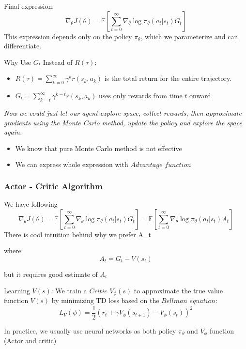 \documentclass[10pt]{beamer}
\begin{document}
\begin{frame}
    Final expression:
    \[
    \nabla_{\theta} J(\theta) = \mathbb{E} \left[ \sum_{t=0}^{\infty} \nabla_{\theta} \log \pi_{\theta}(a_t | s_t) G_t \right]
    \]
    This expression depends only on the policy \( \pi_{\theta} \), which we parameterize and can differentiate.

    \bigskip
    
    Why Use \( G_t \) Instead of \( R(\tau) \):
    \begin{itemize}
        \item \( R(\tau) = \sum_{k=0}^{\infty} \gamma^{k} r(s_k, a_k) \) is the total return for the entire trajectory.
        \item \( G_t = \sum_{k=t}^{\infty} \gamma^{k-t} r(s_k, a_k) \) uses only rewards from time \( t \) onward.
    \end{itemize}
    
    \bigskip

    \textit{Now we could just let our agent explore space, collect rewards, then approximate gradients using the Monte Carlo method, update the policy and explore the space again.}
\end{frame}
\begin{frame}
    \begin{itemize}
        \item We know that pure Monte Carlo method is not effective
        \pause
        \item We can express whole expression with $Advantage$ $function$
    \end{itemize}
\end{frame}

\begin{frame}
    \frametitle{Actor - Critic Algorithm}

    We have following 
    \[
    \nabla_{\theta} J(\theta) = \mathbb{E} \left[ \sum_{t=0}^{\infty} \nabla_{\theta} \log \pi_{\theta}(a_t | s_t) G_t \right] = \mathbb{E} \left[ \sum_{t=0}^{\infty} \nabla_{\theta} \log \pi_{\theta}(a_t | s_t) A_t \right]
    \]
    There is cool intuition behind why we prefer A_t
    
    where
    \[
    A_t = G_t - V(s_t)
    \]
  
    but it requires good estimate of $A_t$
    \pause
    \bigskip
    
    Learning \( V(s) \):
    We train a $Critic$ \( V_\phi(s) \) to approximate the true value function \( V(s) \) by minimizing TD loss based on the $Bellman$ $equation$:
    \[
    L_V(\phi) = \frac{1}{2} \left( r_t + \gamma V_\phi(s_{t+1}) - V_\phi(s_t) \right)^2
    \]

    \bigskip

    In practice, we usually use neural networks as both policy $\pi_\theta$ and $V_\phi$ function (Actor and critic)
\end{frame}
\end{document}
